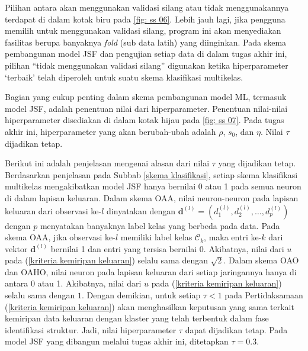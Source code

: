 \noindent Pilihan antara akan menggunakan validasi silang atau tidak menggunakannya terdapat di dalam kotak biru pada \ref{fig: ss 06}. Lebih jauh lagi, jika pengguna memilih untuk menggunakan validasi silang, program ini akan menyediakan fasilitas berupa banyaknya \emph{fold} (sub data latih) yang diinginkan. Pada skema pembangunan model JSF dan pengujian setiap data di dalam tugas akhir ini, pilihan ``tidak menggunakan validasi silang'' digunakan ketika hiperparameter `terbaik' telah diperoleh untuk suatu skema klasifikasi multikelas.

\noindent Bagian yang cukup penting dalam skema pembangunan model ML, termasuk model JSF, adalah penentuan nilai dari hiperparameter. Penentuan nilai-nilai hiperparameter disediakan di dalam kotak hijau pada \ref{fig: ss 07}. Pada tugas akhir ini, hiperparameter yang akan berubah-ubah adalah $\rho$, $s_0$, dan $\eta$. Nilai $\tau$ dijadikan tetap.

\noindent Berikut ini adalah penjelasan mengenai alasan dari nilai $\tau$ yang dijadikan tetap. Berdasarkan penjelasan pada Subbab \ref{skema klasifikasi}, setiap skema klasifikasi multikelas mengakibatkan model JSF hanya bernilai 0 atau 1 pada semua neuron di dalam lapisan keluaran. Dalam skema OAA, nilai neuron-neuron pada lapisan keluaran dari observasi ke-$l$ dinyatakan dengan $\mathbf{d}^{(l)} = (d^{(l)}_1, d^{(l)}_2, \ldots, d^{(l)}_p)$ dengan $p$ menyatakan banyaknya label kelas yang berbeda pada data. Pada skema OAA, jika observasi ke-$l$ memiliki label kelas $\mathcal{C}_k$, maka entri ke-$k$ dari vektor $\mathbf{d}^{(l)}$ bernilai 1 dan entri yang tersisa bernilai 0. Akibatnya, nilai dari $u$ pada (\ref{kriteria kemiripan keluaran}) selalu sama dengan $\sqrt{2}$. Dalam skema OAO dan OAHO, nilai neuron pada lapisan keluaran dari setiap jaringannya hanya di antara 0 atau 1. Akibatnya, nilai dari $u$ pada (\ref{kriteria kemiripan keluaran}) selalu sama dengan $1$. Dengan demikian, untuk setiap $\tau<1$ pada Pertidaksamaan (\ref{kriteria kemiripan keluaran}) akan menghasilkan keputusan yang sama terkait kemiripan data keluaran dengan klaster yang telah terbentuk dalam fase identifikasi struktur. Jadi, nilai hiperparameter $\tau$ dapat dijadikan tetap. Pada model JSF yang dibangun melalui tugas akhir ini, ditetapkan $\tau = \num{0,3}$.

